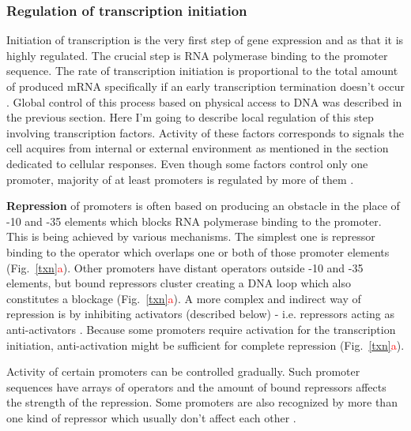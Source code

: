 \subsubsection{Regulation of transcription initiation}
Initiation of transcription is the very first step of gene expression and as that it is highly regulated.
The crucial step is RNA polymerase binding to the promoter sequence.
The rate of transcription initiation is proportional to the total amount of produced mRNA specifically if an early transcription termination doesn't occur \cite{kennell1977transcription, iyer1996absolute}.
Global control of this process based on physical access to DNA was described in the previous section.
Here I'm going to describe local regulation of this step involving transcription factors.
Activity of these factors corresponds to signals the cell acquires from internal or external environment as mentioned in the section dedicated to cellular responses.
Even though some factors control only one promoter, majority of at least  promoters is regulated by more of them \cite{karp2014ecocyc}.

\textbf{Repression} of promoters is often based on producing an obstacle in the place of -10 and -35 elements which blocks RNA polymerase binding to the promoter.
This is being achieved by various mechanisms.
The simplest one is repressor binding to the operator which overlaps one or both of those promoter elements \cite{brent1981mechanism} (Fig.~\ref{txn}\textcolor{red}{a}).
Other promoters have distant operators outside -10 and -35 elements, but bound repressors cluster creating a DNA loop which also constitutes a blockage \cite{semsey2004dna} (Fig.~\ref{txn}\textcolor{red}{a}).
A more complex and indirect way of repression is by inhibiting activators (described below) - i.e. repressors acting as anti-activators \cite{sogaard1993protein}.
Because some promoters require activation for the transcription initiation, anti-activation might be sufficient for complete repression (Fig.~\ref{txn}\textcolor{red}{a}).

Activity of certain promoters can be controlled gradually.
Such promoter sequences have arrays of operators and the amount of bound repressors affects the strength of the repression.
Some promoters are also recognized by more than one kind of repressor which usually don't affect each other \cite{el2009repression}.

